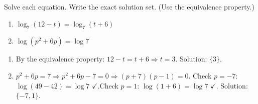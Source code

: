 \documentclass{ximera}
\begin{document}
\begin{problem}
Solve each equation. Write the exact solution set. (Use the equivalence property.)
\begin{enumerate}
  \item[(a)] $\log_7 (12 - t) = \log_7 (t+6)$
  \medskip
  \item[(b)] $\log (p^2 + 6p) = \log 7$
\end{enumerate}

\begin{solution}
\begin{enumerate}
  \item[(a)] By the equivalence property: $12-t=t+6 \Rightarrow t=3$. \quad Solution: $\{3\}$.

  \item[(b)] $p^2+6p=7 \Rightarrow p^2+6p-7=0 \Rightarrow (p+7)(p-1)=0$.
  Check $p=-7$: $\log(49-42)=\log 7$ $\checkmark$.\quad Check $p=1$: $\log(1+6)=\log 7$ $\checkmark$.
  Solution: $\{-7, 1\}$.
\end{enumerate}
\end{solution}
\end{problem}
\end{document}
